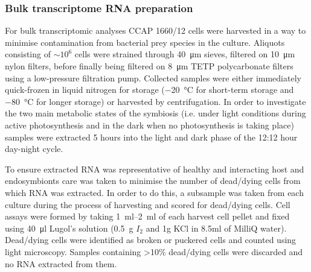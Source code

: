 \subsubsection{Bulk transcriptome RNA preparation}
For bulk transcriptomic analyses CCAP 1660/12 cells were harvested in a way to minimise 
contamination from bacterial prey species in the culture. Aliquots consisting of \(\sim 10^{6}\) 
cells were strained through \SI{40}{\micro\metre} sieves, filtered on 
\SI{10}{\micro\metre} nylon filters, 
before finally being filtered on \SI{8}{\micro\metre} TETP polycarbonate filters using a 
low-pressure filtration pump.  Collected samples were either immediately 
quick-frozen in liquid nitrogen for storage (\SI{-20}{\degreeCelsius} for short-term storage 
and \SI{-80}{\degreeCelsius} for longer storage) or harvested by centrifugation.  
In order to investigate the two main metabolic states of the symbiosis 
(i.e. under light conditions during active photosynthesis and in the dark 
when no photosynthesis is taking place) samples were extracted 5 hours into 
the light and dark phase of the 12:12 hour day-night cycle.

To ensure extracted RNA was representative of healthy and interacting host 
and endosymbionts care was taken to minimise the number of dead/dying cells 
from which RNA was extracted.  In order to do this, a subsample was taken 
from each culture during the process of harvesting and scored for dead/dying cells.  
Cell assays were formed by taking \SIrange{1}{2}{\milli\litre} of each harvest cell pellet and 
fixed using \SI{40}{\micro\litre} Lugol's solution (\SI{0.5}{\gram} \(I_{2}\) and 1g KCl in 8.5ml 
of MilliQ water). Dead/dying cells were identified as broken or puckered cells 
and counted using light microscopy.  Samples containing >10\% dead/dying cells 
were discarded and no RNA extracted from them.

